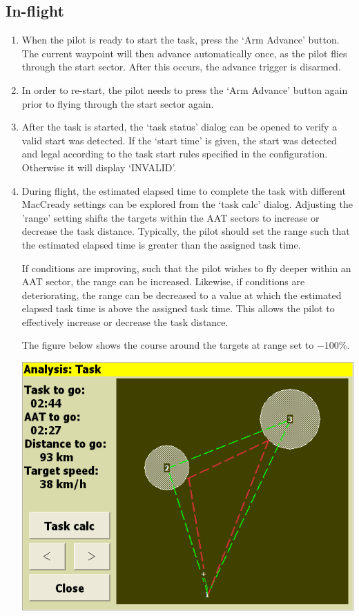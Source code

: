 \documentclass[a4paper,12pt]{refrep}
\begin{document}
\subsection*{In-flight}
\begin{enumerate}
\item When the pilot is ready to start the task, press the `Arm Advance' button.  The current waypoint will then advance automatically once, as the pilot flies through the start sector.  After this occurs, the advance trigger is disarmed.  
\item In order to re-start, the pilot needs to press the `Arm Advance' button again prior to flying through the start sector again.

\item After the task is started, the `task status' dialog can be opened to verify a valid start was detected.  If the `start time' is given, the start was detected and legal according to the task start rules specified in the configuration.  Otherwise it will display `INVALID'.

\item During flight, the estimated elapsed time to complete the task with different MacCready settings can be explored from the `task calc' dialog.  
Adjusting the 'range' setting shifts the targets within the AAT
sectors to increase or decrease the task distance.  Typically, the
pilot should set the range such that the estimated elapsed time is
greater than the assigned task time.

If conditions are improving, such that the pilot wishes to fly deeper
within an AAT sector, the range can be increased.  Likewise, if
conditions are deteriorating, the range can be decreased to a value at
which the estimated elapsed task time is above the assigned task time.
This allows the pilot to effectively increase or decrease the task
distance.

The figure below shows the course around the targets at range set to $-100$\%.
\begin{center}
\includegraphics[angle=0,width=\linewidth,keepaspectratio='true']{figures/aat-short.png}
\end{center}


\end{enumerate}
\end{document}
